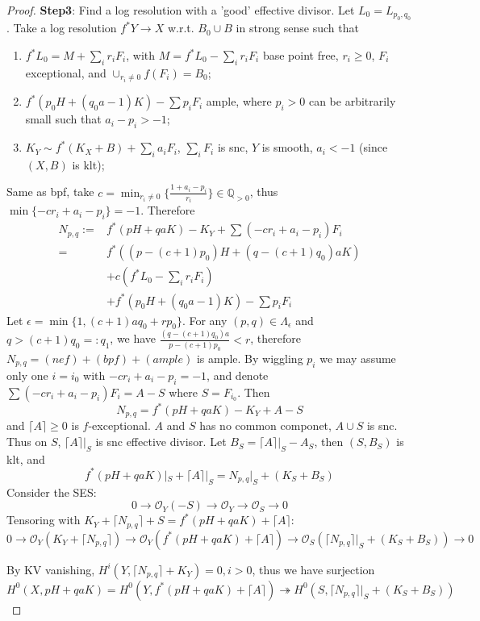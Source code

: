 \documentclass{article}
\begin{document}
\begin{proof}
  \textbf{Step3}: Find a  log resolution with a 'good' effective divisor. Let $ L_0=L_{p_0,q_0} $. Take a log  resolution $ f^*Y\to X $ w.r.t. $ B_0\cup B $ in strong sense such that 
  \begin{enumerate}
    \item $ f^*L_0=M+\sum_ir_iF_i $, with $ M=f^*L_0-\sum_ir_iF_i $ base point free, $ r_i\geqslant 0 $, $ F_i $ exceptional, and $ \cup_{r_i\neq 0}f(F_i)=B_0 $;
    \item $ f^*(p_0H+(q_0a-1)K)-\sum p_iF_i $ ample, where $ p_i>0 $ can be arbitrarily small such that $ a_i-p_i>-1 $;
    \item $ K_Y\sim f^*(K_X+B)+\sum_ia_iF_i $, $ \sum_iF_i $ is snc, $ Y $ is smooth,  $ a_i<-1 $ (since $ (X,B) $ is klt);
  \end{enumerate}
Same as bpf, take $ c=\min_{r_i\neq 0} \{ \frac{1+a_i-p_i}{r_i} \}\in \mathbb{Q}_{>0} $, thus $ \min \{ -cr_i+a_i-p_i \}=-1 $. Therefore
\begin{equation*}
  \begin{aligned}
  N_{p,q}:=&f^*(pH+qaK)-K_Y+\sum(-cr_i+a_i-p_i)F_i\\
  =&f^*((p-(c+1)p_0)H+(q-(c+1)q_0)aK)\\
  &+c(f^*L_0-\sum_ir_iF_i )\\
  &+f^*(p_0H+(q_0a-1)K)-\sum p_iF_i
  \end{aligned}
\end{equation*}
Let $ \epsilon=\min\{1,(c+1)aq_0+rp_0\} $. For any $ (p,q)\in \Lambda_{\epsilon} $ and $ q>(c+1)q_0=:q_1 $, we have $ \frac{(q-(c+1)q_0)a}{p-(c+1)p_0}<r $, therefore $ N_{p,q}=(nef)+(bpf)+(ample) $ is ample. By wiggling $ p_i $  we may assume only one $ i=i_0 $ with $ -cr_i+a_i-p_i=-1 $, and denote $ \sum(-cr_i+a_i-p_i)F_i=A-S $ where $ S=F_{i_0} $. Then 
\[ N_{p,q}=f^*(pH+qaK)-K_Y+A-S \] 
and $ \lceil A\rceil\geqslant 0 $ is $ f $-exceptional. $ A $ and $S  $ has no common componet, $ A\cup S $ is snc. Thus on $ S $, $ \lceil A\rceil|_S $ is snc effective divisor. Let $ B_S=\lceil A\rceil|_S-A_S $, then $ (S,B_S) $ is klt, and
$$ f^*(pH+qaK)|_S+\lceil A\rceil|_S=N_{p,q}|_S+(K_S+B_S) $$ 
Consider the  SES:
\[ 0\to \mathcal{O}_Y(-S)\to \mathcal{O}_Y\to \mathcal{O}_S\to 0    \]
Tensoring with $ K_Y+\lceil N_{p,q}\rceil +S=f^*(pH+qaK)+\lceil A\rceil $:
\[ 0\to \mathcal{O}_Y(K_Y+\lceil N_{p,q}\rceil)\to \mathcal{O}_Y(f^*(pH+qaK)+\lceil A\rceil)\to \mathcal{O}_S(\lceil N_{p,q}\rceil|_S+(K_S+B_S))\to 0    \]

By KV vanishing, $ H^i(Y,\lceil N_{p,q}\rceil +K_Y)=0, i>0 $, thus we have surjection
\[ H^0(X,pH+qaK)=H^0(Y,f^*(pH+qaK)+\lceil A\rceil)\twoheadrightarrow H^0(S,\lceil N_{p,q}\rceil|_S+(K_S+B_S)) \]




\end{proof}
\end{document}
